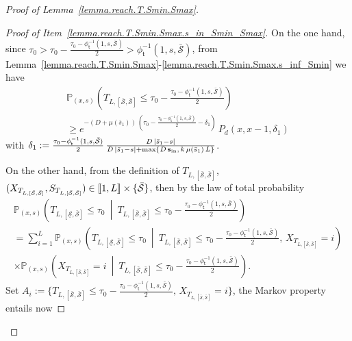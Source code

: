 \documentclass[AHL,Unicode,longabstracts,published]{cedram}
\newcommand{\llbracket}{\mathopen{[\mkern -2.7mu[}}
\newcommand{\rrbracket}{\mathclose{]\mkern -2.7mu]}}
\newcommand{\PP}{\mathbb{P}}
\newcommand{\Sin}{{\mathbf s}_{\textrm{\tiny\rm in}}}
\newcommand{\Smin}{\underline{\mathcal{S}}}
\newcommand{\Smax}{\bar{\mathcal{S}}}
\newcommand{\barmu}{\mu(\bar s_1)}
\newcommand{\phit}{\phi_\textsf{t}^{-1}}
\newcommand{\1}{\mathbf{1}}
\begin{document}
\begin{proof}[Proof of Lemma~\ref{lemma.reach.T.Smin.Smax}]
\begin{proof}[{Proof of Item~\eqref{lemma.reach.T.Smin.Smax.s_in_Smin_Smax}}]
On the one hand, since $\tau_0>\tau_0-\frac{\tau_0-\phit(1, s,\Smax)}{2}>\phit(1, s,\Smax)$, from Lemma~\ref{lemma.reach.T.Smin.Smax}-\ref{lemma.reach.T.Smin.Smax.s_inf_Smin} we have
\begin{multline}\label{lemma.reachS.exit}
\PP_{(x,s)}\left(T_{L,[\Smax,\Smax]}\leq\tau_0-\frac{\tau_0-\phit\left(1, s,\Smax\right)}{2}\right)
\\ 
\geq e^{-(D+\barmu)\,\left(\tau_0-\frac{\tau_0-\phit\left(1, s,\Smax\right)}{2}-\delta_1\right)}\, P_d(x,x-1, \delta_1)
\end{multline}
with $\delta_1:=\frac{\tau_0-\phit(1, s,\Smax)}{2}\,\frac{D\,|\bar s_1-s|}{D\,|\bar s_1-s|+\max\{D\,\Sin,\,k\,\barmu\,L\}}$.


On the other hand, from the definition of $T_{L,[\Smax, \Smax]}$, $(X_{T_{L,[\Smax,\Smax]}},S_{T_{L,[\Smax,\Smax]}})\in \llbracket 1, L \rrbracket \times \{\Smax\}$, then by the law of total probability
\begin{multline*}
\PP_{(x,s)}\left(T_{L,[\Smin,\Smax]}\leq\tau_0\ \middle| \ T_{L,[\Smax,\Smax]}\leq \tau_0-\frac{\tau_0-\phit\left(1, s,\Smax\right)}{2} \right)
\\
=
\sum_{i=1}^L
\PP_{(x,s)}
\left(T_{L,[\Smin,\Smax]}\leq\tau_0 \ \middle| \ T_{L,[\Smax,\Smax]}\leq \tau_0-\frac{\tau_0-\phit\left(1, s,\Smax\right)}{2},\, X_{T_{L,[\Smax,\Smax]}}=i\right)
\\
\times
\PP_{(x,s)}
\left(X_{T_{L,[\Smax,\Smax]}}=i \ \middle| \ T_{L,[\Smax,\Smax]}\leq \tau_0-\frac{\tau_0-\phit\left(1, s,\Smax\right)}{2} \right).
\end{multline*}
Set $A_i:=\{ T_{L,[\Smax,\Smax]}\leq \tau_0-\frac{\tau_0-\phit(1, s,\Smax)}{2},\,X_{T_{L,[\Smax,\Smax]}}=i\}$, the Markov property entails now


\end{proof}
\end{proof}
\end{document}
